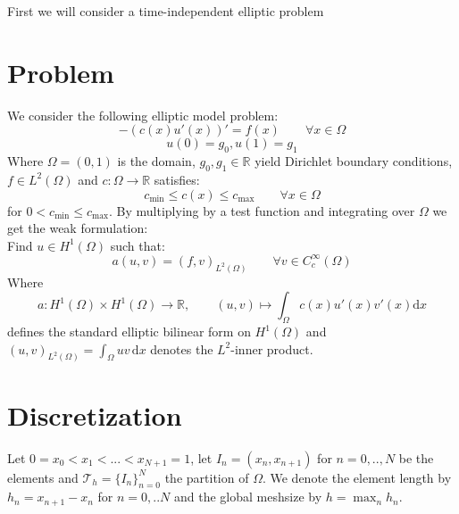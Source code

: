 First we will consider a time-independent elliptic problem
\section{Problem}
We consider the following elliptic model problem:
\begin{equation}
    -(c(x)u'(x))' = f(x) \qquad \forall x\in \Omega
\end{equation} 
\begin{equation}
    u(0) = g_0, u(1) = g_1
\end{equation}
Where $\Omega = (0,1)$ is the domain, $g_0, g_1 \in \mathbb{R}$ yield
Dirichlet boundary conditions, $f \in L^2(\Omega)$ and $c:\Omega \to \mathbb{R}$
satisfies:
\[
    c_{\min} \leq c(x) \leq c_{\max} \qquad \forall x\in \Omega
\]
for $0 < c_{\min} \leq c_{\max}$.
By multiplying by a test function and integrating over $\Omega$ we get the 
weak formulation: \\
Find $u \in H^1(\Omega)$ such that:
\begin{equation}
    a(u,v) = (f,v)_{L^2(\Omega)} \qquad \forall v \in C_c^{\infty}(\Omega)
\end{equation}
Where 
\[
    a:H^1(\Omega) \times H^1(\Omega) \to \mathbb{R}, \qquad (u,v) \mapsto \int_{\Omega} c(x)u'(x)v'(x) \text{d}x
\]  
defines the standard elliptic bilinear form on $H^1(\Omega)$ and $(u,v)_{L^2(\Omega)} = \int_{\Omega} uv \,\text{d}x$
denotes the $L^2$-inner product.

\section{Discretization}
Let $0=x_0 < x_1 < ... < x_{N+1} = 1$, let $I_n = (x_n, x_{n+1})$ for $n = 0,..,N$ be the elements and $\mathcal{T}_h = \{I_n\}_{n=0}^N$ the partition
of $\Omega$.
We denote the element length by $h_n = x_{n+1} - x_{n}$ for $n=0,..N$ and the global meshsize by
$h = \max_{n} h_n$.